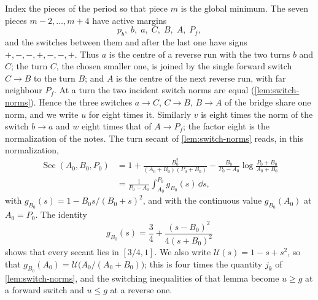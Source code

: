 Index the pieces of the period so that piece $m$ is the global minimum. The seven pieces
$m-2,\dots,m+4$ have active margins
\[
  p_b,\; b,\; a,\; C,\; B,\; A,\; P_f,
\]
and the switches between them and after the last one have signs $+,-,-,+,-,-,+$. Thus $a$ is the
centre of a reverse run with the two turns $b$ and $C$; the turn $C$, the chosen smaller one, is
joined by the single forward switch $C\to B$ to the turn $B$; and $A$ is the centre of the next
reverse run, with far neighbour $P_f$. At a turn the two incident switch norms are equal
(\cref{lem:switch-norms}). Hence the three switches $a\to C$, $C\to B$, $B\to A$ of the bridge
share one norm, and we write $u$ for eight times it. Similarly $v$ is eight times the norm of the
switch $b\to a$ and $w$ eight times that of $A\to P_f$; the factor eight is the normalization of
the notes. The turn secant of \cref{lem:switch-norms} reads, in this normalization,
\begin{equation}\label{eq:ss-secant}
\begin{aligned}
  \operatorname{Sec}(A_0,B_0,P_0)&=1+\frac{B_0^2}{(A_0+B_0)(P_0+B_0)}
   -\frac{B_0}{P_0-A_0}\log\frac{P_0+B_0}{A_0+B_0}\\
   &=\frac{1}{P_0-A_0}\int_{A_0}^{P_0} g_{B_0}(s)\,\dd s,
\end{aligned}
\end{equation}
with $g_{B_0}(s)=1-B_0s/(B_0+s)^2$, and with the continuous value $g_{B_0}(A_0)$ at $A_0=P_0$.
The identity
\begin{equation}\label{eq:ss-g}
  g_{B_0}(s)=\frac34+\frac{(s-B_0)^2}{4(s+B_0)^2}
\end{equation}
shows that every secant lies in $[3/4,1]$. We also write $\mathcal U(s)=1-s+s^2$, so that
$g_{B_0}(A_0)=\mathcal U\bigl(A_0/(A_0+B_0)\bigr)$; this is four times the quantity $j_k$ of
\cref{lem:switch-norms}, and the switching inequalities of that lemma become $u\ge g$ at a forward
switch and $u\le g$ at a reverse one.

